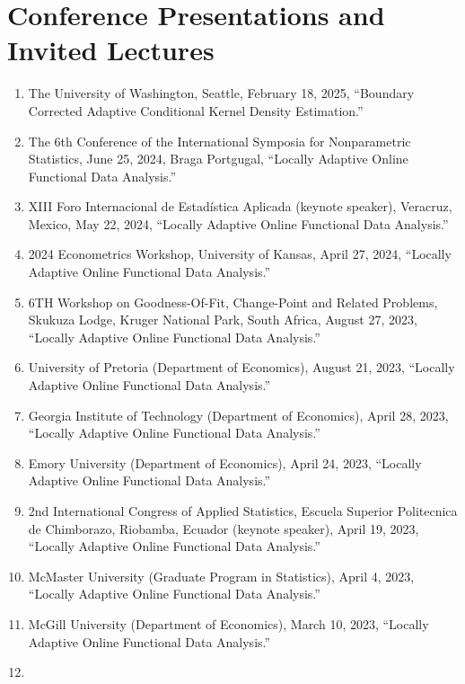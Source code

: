 \documentclass[
]{article}
\begin{document}
\section*{Conference Presentations and Invited
Lectures}\label{conference-presentations-and-invited-lectures}

\begin{enumerate}
\def\labelenumi{\arabic{enumi}.}
\item
  The University of Washington, Seattle, February 18, 2025, ``Boundary
  Corrected Adaptive Conditional Kernel Density Estimation.''
\item
  The 6th Conference of the International Symposia for Nonparametric
  Statistics, June 25, 2024, Braga Portgugal, ``Locally Adaptive Online
  Functional Data Analysis.''
\item
  XIII Foro Internacional de Estadística Aplicada (keynote speaker),
  Veracruz, Mexico, May 22, 2024, ``Locally Adaptive Online Functional
  Data Analysis.''
\item
  2024 Econometrics Workshop, University of Kansas, April 27, 2024,
  ``Locally Adaptive Online Functional Data Analysis.''
\item
  6TH Workshop on Goodness-Of-Fit, Change-Point and Related Problems,
  Skukuza Lodge, Kruger National Park, South Africa, August 27, 2023,
  ``Locally Adaptive Online Functional Data Analysis.''
\item
  University of Pretoria (Department of Economics), August 21, 2023,
  ``Locally Adaptive Online Functional Data Analysis.''
\item
  Georgia Institute of Technology (Department of Economics), April 28,
  2023, ``Locally Adaptive Online Functional Data Analysis.''
\item
  Emory University (Department of Economics), April 24, 2023, ``Locally
  Adaptive Online Functional Data Analysis.''
\item
  2nd International Congress of Applied Statistics, Escuela Superior
  Politecnica de Chimborazo, Riobamba, Ecuador (keynote speaker), April
  19, 2023, ``Locally Adaptive Online Functional Data Analysis.''
\item
  McMaster University (Graduate Program in Statistics), April 4, 2023,
  ``Locally Adaptive Online Functional Data Analysis.''
\item
  McGill University (Department of Economics), March 10, 2023, ``Locally
  Adaptive Online Functional Data Analysis.''
\item

\end{enumerate}
\end{document}
